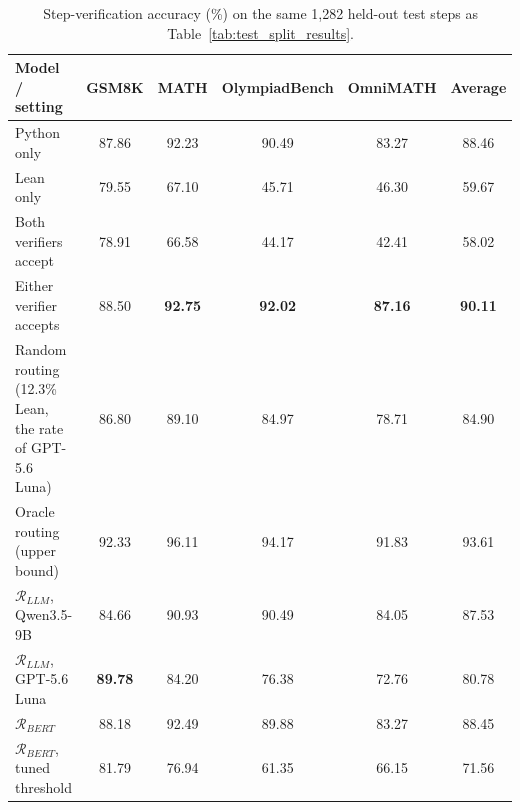 \begin{table}[ht]
\centering
\begin{tabular}{lccccc}
\hline
\textbf{Model / setting} & \textbf{GSM8K} & \textbf{MATH} & \textbf{OlympiadBench} & \textbf{OmniMATH} & \textbf{Average} \\
\hline
Python only & 87.86 & 92.23 & 90.49 & 83.27 & 88.46 \\
Lean only & 79.55 & 67.10 & 45.71 & 46.30 & 59.67 \\
Both verifiers accept & 78.91 & 66.58 & 44.17 & 42.41 & 58.02 \\
Either verifier accepts & 88.50 & \textbf{92.75} & \textbf{92.02} & \textbf{87.16} & \textbf{90.11} \\
Random routing (12.3\% Lean, the rate of GPT-5.6 Luna) & 86.80 & 89.10 & 84.97 & 78.71 & 84.90 \\
Oracle routing (upper bound) & 92.33 & 96.11 & 94.17 & 91.83 & 93.61 \\
\midrule
$\mathcal{R}_{LLM}$, Qwen3.5-9B & 84.66 & 90.93 & 90.49 & 84.05 & 87.53 \\
$\mathcal{R}_{LLM}$, GPT-5.6 Luna & \textbf{89.78} & 84.20 & 76.38 & 72.76 & 80.78 \\
$\mathcal{R}_{BERT}$ & 88.18 & 92.49 & 89.88 & 83.27 & 88.45 \\
$\mathcal{R}_{BERT}$, tuned threshold & 81.79 & 76.94 & 61.35 & 66.15 & 71.56 \\
\hline
\end{tabular}
\caption{Step-verification accuracy (\%) on the same 1,282 held-out test steps as Table~\ref{tab:test_split_results}.}
\label{tab:test_split_accuracy}
\end{table}
